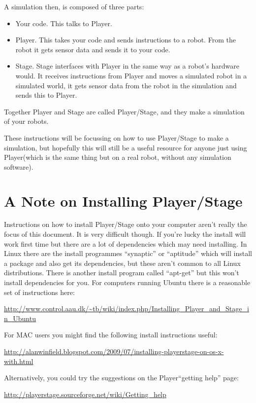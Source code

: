\documentclass[a4paper]{report}
\newcommand{\plst}{Player/Stage\xspace}
\newcommand{\pl}{Player\xspace}
\begin{document}
A simulation then, is composed of three parts:
\begin{itemize}
\item Your code. This talks to \pl.
\item \pl. This takes your code and sends instructions to a robot. From the robot it gets sensor data and sends it to your code.
\item Stage. Stage interfaces with \pl in the same way as a robot's hardware would. It receives instructions from \pl and moves a simulated robot in a simulated world, it gets sensor data from the robot in the simulation and sends this to \pl.
\end{itemize}
Together \pl and Stage are called \plst, and they make a simulation of your robots.

These instructions will be focussing on how to use \plst to make a simulation, but hopefully this will still be a useful resource for anyone just using \pl (which is the same thing but on a real robot, without any simulation software).

\section{A Note on Installing \plst}
Instructions on how to install \plst onto your computer aren't really the focus of this document. It is very difficult though. If you're lucky the install will work first time but there are a lot of dependencies which may need installing. In Linux there are the install programmes ``synaptic'' or ``aptitude'' which will install a package and also get its dependencies, but these aren't common to all Linux distributions. There is another install program called ``apt-get'' but this won't install dependencies for you. For computers running Ubuntu there is a reasonable set of instructions here:
\begin{center}
\url{http://www.control.aau.dk/~tb/wiki/index.php/Installing_Player_and_Stage_in_Ubuntu}
\end{center}
For MAC users you might find the following install instructions useful:
\begin{center}
\url{http://alanwinfield.blogspot.com/2009/07/installing-playerstage-on-os-x-with.html}
\end{center}
Alternatively, you could try the suggestions on the \pl ``getting help'' page:
\begin{center}
	\url{http://playerstage.sourceforge.net/wiki/Getting_help}
\end{center}
\end{document}
